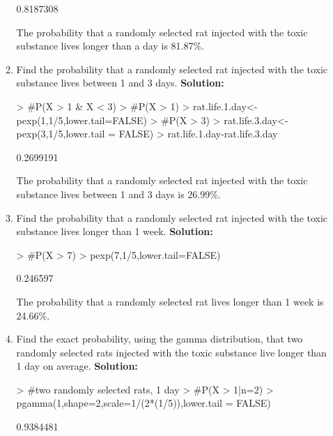 \documentclass{article}
\begin{document}
\begin{enumerate}
\begin{enumerate}
\begin{Schunk}
\begin{Soutput}
[1] 0.8187308
\end{Soutput}
\end{Schunk}
The probability that a randomly selected rat injected with the toxic substance lives longer than a day is 81.87\%.
	  \item Find the probability that a randomly selected rat injected with the toxic substance
	  lives between 1 and 3 days.
	  \newline
	  \textbf{Solution:}
\begin{Schunk}
\begin{Sinput}
> #P(X > 1 & X < 3)
> #P(X > 1)
> rat.life.1.day<-pexp(1,1/5,lower.tail=FALSE)
> #P(X > 3)
> rat.life.3.day<-pexp(3,1/5,lower.tail = FALSE)
> rat.life.1.day-rat.life.3.day
\end{Sinput}
\begin{Soutput}
[1] 0.2699191
\end{Soutput}
\end{Schunk}
The probability that a randomly selected rat injected with the toxic substance lives between 1 and 3 days is 26.99\%. 
	  \item Find the probability that a randomly selected rat injected with the toxic substance
	  lives longer than 1 week.
	  \newline
	  \textbf{Solution:}
\begin{Schunk}
\begin{Sinput}
> #P(X > 7)
> pexp(7,1/5,lower.tail=FALSE)
\end{Sinput}
\begin{Soutput}
[1] 0.246597
\end{Soutput}
\end{Schunk}
The probability that a randomly selected rat lives longer than 1 week is 24.66\%.
	  \item Find the exact probability, using the gamma distribution, that two randomly selected 
	  rats injected with the toxic substance live longer than 1 day on average.
	  \newline
	  \textbf{Solution:}
\begin{Schunk}
\begin{Sinput}
> #two randomly selected rats, 1 day
> #P(X > 1|n=2)
> pgamma(1,shape=2,scale=1/(2*(1/5)),lower.tail = FALSE)
\end{Sinput}
\begin{Soutput}
[1] 0.9384481
\end{Soutput}
\end{Schunk}

\end{enumerate}
\end{enumerate}
\end{document}
